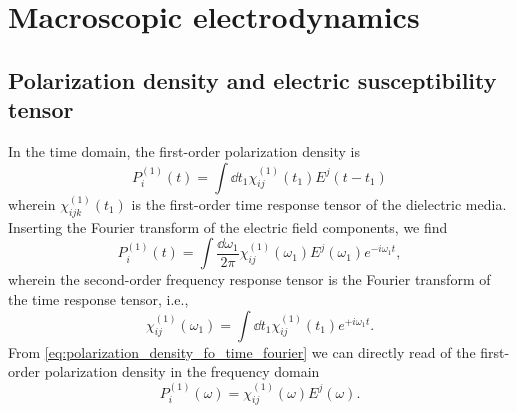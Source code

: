 \chapter{Macroscopic electrodynamics}

\section{Polarization density and electric susceptibility tensor}\label{sec:polarization_density_susceptibility}

In the time domain, the first-order polarization density is~\cite[p.~17]{Murti2014}
\begin{equation}
	P_i^{(1)}(t)
	=
	\int\dd{t_1}
	\chi^{(1)}_{ij}(t_1)
	E^j(t-t_1)
	\label{eq:polarization_density_fo_time}
\end{equation}
wherein $\chi^{(1)}_{ijk}(t_1)$ is the first-order time response tensor of the dielectric media.
Inserting the Fourier transform of the electric field components, we find
\begin{equation}
	P_i^{(1)}(t)
	=
	\int\frac{\dd{\omega_1}}{2\pi}
	\chi^{(1)}_{ij}(\omega_1)
	E^j(\omega_1)
	e^{-i\omega_1t}
	\label{eq:polarization_density_fo_time_fourier}
	,
\end{equation}
wherein the second-order frequency response tensor is the Fourier transform of the time response tensor, i.e.,
\begin{equation}
	\chi^{(1)}_{ij}(\omega_1)
	=
	\int\dd{t_1}
	\chi^{(1)}_{ij}(t_1)
	e^{+i\omega_1t}
	.
\end{equation}
From \cref{eq:polarization_density_fo_time_fourier} we can directly read of the first-order polarization density in the frequency domain
\begin{equation}
	P_i^{(1)}(\omega)
	=
	\chi^{(1)}_{ij}(\omega)
	E^j(\omega)
	.
	\label{eq:polarization_density_fo_freq}
\end{equation}


